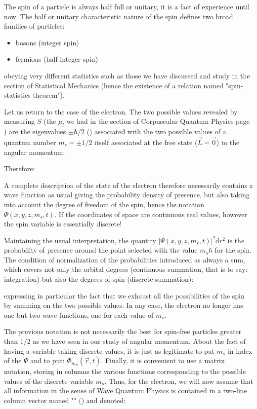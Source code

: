 	The spin of a particle is always half full or unitary, it is a fact of experience until now. The half or unitary characteristic nature of the spin defines two broad families of particles:
	\begin{itemize}
		\item bosons (integer spin)
		
		\item fermions (half-integer spin)
	\end{itemize}  	
	obeying very different statistics such as those we have discussed and study in the section of Statistical Mechanics (hence the existence of a relation named "spin-statistics theorem").

	Let us return to the case of the electron. The two possible values revealed by measuring $S$ (the $\mu_l$ we had in the section of Corpuscular Quantum Physics page \pageref{magnetic dipole moment}) are the eigenvalues $\pm\hbar/2$ () associated with the two possible values of a quantum number $m_s=\pm 1/2$ itself associated at the free state ($\vec{L}=\vec{0}$) to the angular momentum:
	
	Therefore:
	
	A complete description of the state of the electron therefore necessarily contains a wave function as usual giving the probability density of presence, but also taking into account the degree of freedom of the spin, hence the notation $\Psi(x,y,z,m_s,t)$. If the coordinates of space are continuous real values, however the spin variable is essentially discrete!
	
	Maintaining the usual interpretation, the quantity $|\Psi(x,y,z,m_s,t)|^2\mathrm{d}r^2$ is the probability of presence around the point selected with the value $m_s\hbar$ for the spin. The condition of normalization of the probabilities introduced as always a sum, which covers not only the orbital degrees (continuous summation, that is to say: integration) but also the degrees of spin (discrete summation):
	
	expressing in particular the fact that we exhaust all the possibilities of the spin by summing on the two possible values. In any case, the electron no longer has one but two wave functions, one for each value of $m_s$.
	
	The previous notation is not necessarily the best for spin-free particles greater than $1/2$ as we have seen in our study of angular momentum. About the fact of having  a variable taking discrete values, it is just as legitimate to put $m_s$ in index of the $\Psi$ and to put: $\Phi_{m_S}(\vec{r},t)$. Finally, it is convenient to use a matrix notation, storing in columns the various functions corresponding to the possible values of the discrete variable $m_s$. Thus, for the electron, we will now assume that all information in the sense of Wave Quantum Physics is contained in a two-line column vector named "\label{spinor relativistic quantum physics}" () and denoted:
	

